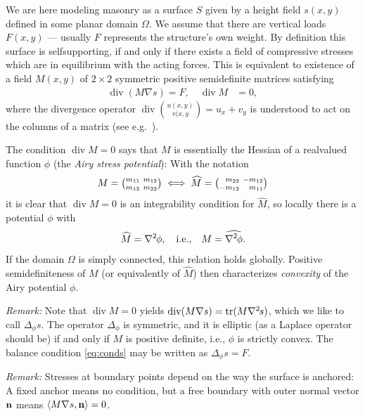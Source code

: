 \documentclass[annual]{acmsiggraph}
\def\<{\mathchoice{\big\langle}{\langle}{\langle}{\langle}}
\def\>{\mathchoice{\big\rangle}{\rangle}{\rangle}{\rangle}}
\def\wh{\widehat}
\def\Div{\mathop{\textrm{div}}\nolimits}
\def\tr{\mathop{\textrm{tr}}\nolimits}
\def\ess{s}
\def\Hess#1{{\def\testess{#1}\nabla^2\ifx\testess\ess\!s\else #1\fi}}
\def\Hess#1{\text{$\nabla^2\hskip-.2ex #1$}}
\begin{document}
We are here modeling masonry as a surface $S$ given by a height field 
$s(x,y)$ defined in some planar domain $\Omega$. We assume that there are 
vertical loads $F(x,y)$ --- usually $F$ represents the structure's own 
weight. By definition this surface is self\dash supporting, if and only if 
there exists a field of compressive stresses which are in equilibrium with 
the acting forces. This is equivalent to existence of a field $M(x,y)$ of 
$2\times 2$ symmetric positive semidefinite matrices satisfying
	\begin{align}
	\Div (M\nabla s) = F, \quad
	\Div M &= 0,
	  \label{eq:conds}
	\end{align} 
 where the divergence operator $\Div{u(x,y)\choose v(x,y}= u_x + v_y$ is 
understood to act on the columns of a matrix (see e.g.\ 
\cite{Fraternali2010}).

The condition $\Div M=0$ says that $M$ is essentially the Hessian of a 
real\dash valued function $\phi$ (the {\em Airy stress potential}): With 
the notation
	$$
	M = 
	{\textstyle {m_{11} \ m_{12} \choose m_{12} \ m_{22}}}
	\iff	
	\wh M = 
	{\textstyle {\hphantom{-}m_{22} \ -m_{12} \choose -m_{12}
		 \ \hphantom{-}m_{11}}}
	$$
 it is clear that $\Div M=0$ is an integrability condition for $\wh M$, so 
locally there is a potential $\phi$ with
	$$
	\wh M = \Hess\phi, \quad \text{i.e.,}\quad
	M = \wh{\Hess\phi}.
	$$
 If the domain $\Omega$ is simply connected, this relation holds globally. 
Positive semidefiniteness of $M$ (or equivalently of $\wh M$) then 
characterizes {\em convexity} of the Airy potential $\phi$.

{\it Remark:} Note that $\Div M =0$ yields $\Div(M\nabla s) = \tr(M\Hess 
s)$, which we like to call $\Delta_\phi s$. The operator $\Delta_\phi$ is 
symmetric, and it is elliptic (as a Laplace operator should be) if and 
only if $M$ is positive definite, i.e., $\phi$ is strictly convex. The 
balance condition \eqref{eq:conds} may be written as
	$
	\Delta_\phi s = F.
	$


{\it Remark:} Stresses at boundary points depend on the way the surface is 
anchored: A fixed anchor means no condition, but a free boundary with 
outer normal vector ${\mathbf n}$ means $\<M \nabla s, \nw \> = 0$.
\end{document}
